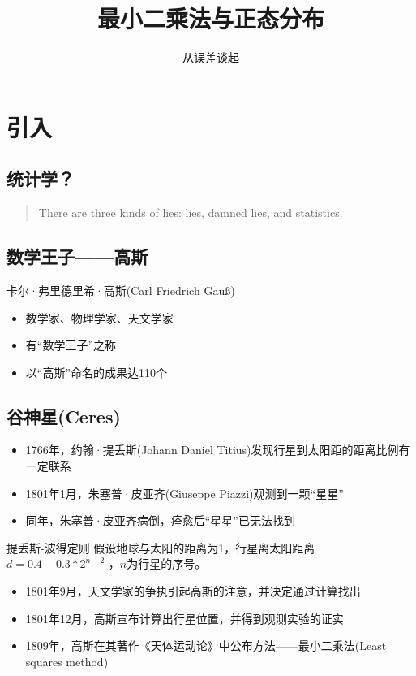 \documentclass[14pt,hyperref={CJKbookmarks=true}]{beamer}
\begin{document}
\kaishu
\title[期中展示]{最小二乘法与正态分布}
\subtitle[期中展示]{从误差谈起}
\begin{frame}
\titlepage
\end{frame}
\section{引入}
\subsection{统计学？}
\begin{frame}
\begin{quote}
There are three kinds of lies: lies, damned lies,
and statistics.
\end{quote}
\end{frame}
\subsection{数学王子——高斯}
\begin{frame}
卡尔·弗里德里希·高斯(Carl Friedrich Gauß)
\begin{itemize}
\item 数学家、物理学家、天文学家
\item 有“数学王子”之称
\item 以“高斯”命名的成果达110个
\end{itemize}
\end{frame}
\subsection{谷神星(Ceres)}
\begin{frame}
\begin{itemize}
\item 1766年，约翰·提丢斯(Johann Daniel Titius)发现行星到太阳距的距离比例有一定联系
\item 1801年1月，朱塞普·皮亚齐(Giuseppe Piazzi)观测到一颗“星星”
\item 同年，朱塞普·皮亚齐病倒，痊愈后“星星”已无法找到
\end{itemize}
\begin{theorem}{提丢斯-波得定则}
假设地球与太阳的距离为1，行星离太阳距离 $d = 0.4 + 0.3*2^{n-2}$ ，$n$为行星的序号。
\end{theorem}
\end{frame}
\begin{frame}
\begin{itemize}
\item 1801年9月，天文学家的争执引起高斯的注意，并决定通过计算找出
\item 1801年12月，高斯宣布计算出行星位置，并得到观测实验的证实
\item 1809年，高斯在其著作《天体运动论》中公布方法——最小二乘法(Least squares method)
\end{itemize}
\end{frame}
\end{document}
